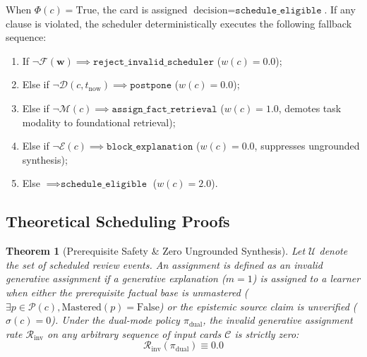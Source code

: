 \documentclass[11pt,a4paper]{article}
\newtheorem{theorem}{Theorem}
\begin{document}
When $\Phi(c) = \text{True}$, the card is assigned $\text{decision} = \texttt{schedule\_eligible}$. If any clause is violated, the scheduler deterministically executes the following fallback sequence:
\begin{enumerate}
    \item If $\neg\mathcal{F}(\mathbf{w}) \implies \texttt{reject\_invalid\_scheduler}$ ($w(c) = 0.0$);
    \item Else if $\neg\mathcal{D}(c, t_{\text{now}}) \implies \texttt{postpone}$ ($w(c) = 0.0$);
    \item Else if $\neg\mathcal{M}(c) \implies \texttt{assign\_fact\_retrieval}$ ($w(c) = 1.0$, demotes task modality to foundational retrieval);
    \item Else if $\neg\mathcal{E}(c) \implies \texttt{block\_explanation}$ ($w(c) = 0.0$, suppresses ungrounded synthesis);
    \item Else $\implies \texttt{schedule\_eligible}$ ($w(c) = 2.0$).
\end{enumerate}

\subsection{Theoretical Scheduling Proofs}

\begin{theorem}[Prerequisite Safety \& Zero Ungrounded Synthesis]
\label{thm:safety}
Let $\mathcal{U}$ denote the set of scheduled review events. An assignment is defined as an \textit{invalid generative assignment} if a generative explanation ($m=1$) is assigned to a learner when either the prerequisite factual base is unmastered ($\exists p \in \mathcal{P}(c), \text{Mastered}(p) = \text{False}$) or the epistemic source claim is unverified ($\sigma(c) = 0$). Under the dual-mode policy $\pi_{\text{dual}}$, the invalid generative assignment rate $\mathcal{R}_{\text{inv}}$ on any arbitrary sequence of input cards $\mathcal{C}$ is strictly zero:
\begin{equation}
    \mathcal{R}_{\text{inv}}(\pi_{\text{dual}}) \equiv 0.0
\end{equation}
\end{theorem}
\end{document}
